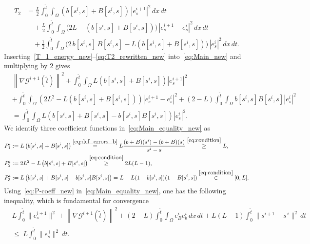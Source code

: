 \documentclass[review,11pt]{article}
\numberwithin{equation}{section}
\begin{document}
\begin{align}\label{eq:T2_rewritten_new}
T_2
&= \frac{L}{2}\int_0^{\tilde{t}} \int_\Omega 
    (b[s^i,s] + B[s^i,s])\, |e_s^{i+1}|^2\,dx\,dt\nonumber\\ 
  &\quad      
  +\frac{L}{2}\int_0^{\tilde{t}} \int_\Omega 
    \big( 2L - (b[s^i,s] + B[s^i,s]) \big)\, 
    |e_s^{i+1} - e_s^i|^2\,dx\,dt       \nonumber\\ 
  &\quad 
  + \frac{1}{2}\int_0^{\tilde{t}} \int_\Omega 
    \big( 2\, b[s^i,s]\, B[s^i,s] 
    - L(b[s^i,s] + B[s^i,s]) \big)\,
    |e_s^i|^2\,dx\,dt.
\end{align}
Inserting~\eqref{T_1_energy_new}--\eqref{eq:T2_rewritten_new} 
into~\eqref{eq:Main_new} and multiplying by $2$ gives
\begin{align}\label{eq:Main_equality_new}
    &\left\| \nabla \mathcal{G}^{i+1}({\tilde{t}})\right\|^2
    + \int_0^{\tilde{t}} \int_\Omega L \left( b[s^i,s] + B[s^i,s] \right) \left| e_s^{i+1} \right|^2 \nonumber \\
    &+ \int_0^{\tilde{t}} \int_\Omega \left( 2L^2 - L\left( b[s^i,s] + B[s^i,s] \right) \right) 
    \left| e_s^{i+1} - e_s^i \right|^2 
    + (2-L)\int_0^{\tilde{t}} \int_\Omega  b[s^i,s] B[s^i,s]  \left| e_s^i \right|^2 \nonumber \\
    &= \int_0^{\tilde{t}} \int_\Omega L\left( b[s^i,s] + B[s^i,s]-  b[s^i,s] B[s^i,s] \right) \left| e_s^i \right|^2.
\end{align}
We identify three coefficient functions 
in~\eqref{eq:Main_equality_new} as
\begin{subequations}\label{eq:P-coeff_new}
\begin{align}
P_1^i
&:=  L \left( b[s^i,s] + B[s^i,s] \right)
\overset{\eqref{eq:def_errors_b}}{=}
L \frac{(b + B)(s^i) - (b + B)(s)}{s^i - s}
\overset{\eqref{eq:condition}}{\geq} L, \\
P_2^i
&:= 2L^2 - L\left( b[s^i,s] + B[s^i,s] \right)
\overset{\eqref{eq:condition}}{\geq} 2L(L-1), \\
P_3^i
&:= L\left( b[s^i,s] + B[s^i,s]-  b[s^i,s] B[s^i,s] \right) = L - L(1 - b[s^i, s])(1 - B[s^i, s]) \overset{\eqref{eq:condition}}\in [0,L]. 
\end{align}
\end{subequations}
Using~\eqref{eq:P-coeff_new} in~\eqref{eq:Main_equality_new}, one has the following inequality, which is fundamental for convergence
\begin{align}\label{eq:final_estimate_new}
    &L \int_0^{\tilde{t}} \|e_s^{i+1}\|^{2}
    +\left\| \nabla \mathcal{G}^{i+1}({\tilde{t}})\right\|^2+
    (2-L)\int_0^{\tilde{t}} \int_\Omega e^i_B e^i_b\,dx\,dt + L(L-1)\int_0^{\tilde{t}} \|s^{i+1} -s^{\,i}\|^{2}\,dt
    \nonumber \\ 
    &\le\;
    L\int_0^{\tilde{t}} \|e_s^{\,i}\|^{2}\,dt.
\end{align}
\end{document}
